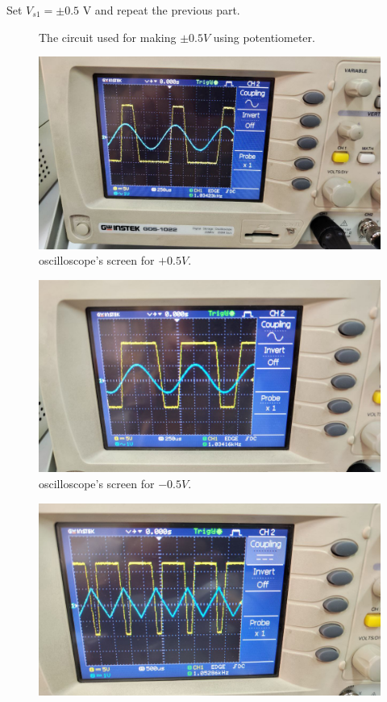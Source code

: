 \documentclass[11pt]{article}
\newcommand{\PicScale}{0.2}
\begin{document}
\begin{question}
\begin{subquestion}{Set $V_{s1}=\pm 0.5$ V and repeat the previous part.}
{\begin{figure}[H]
                \caption{The circuit used for making $\pm 0.5V$ using potentiometer.}
            \end{figure}
            \begin{figure}[H]
                \centering
                \includegraphics[scale=\PicScale,angle=0]{Fig/7.jpeg}
                \caption{oscilloscope's screen for $+0.5V$.}
            \end{figure}
            \begin{figure}[H]
                \centering
                \includegraphics[scale=\PicScale,angle=0]{Fig/9.jpeg}
                \caption{oscilloscope's screen for $-0.5V$.}
            \end{figure}
            \begin{figure}[H]
                \centering
                \includegraphics[scale=\PicScale,angle=0]{Fig/52.jpeg}

\end{figure}}
\end{subquestion}
\end{question}
\end{document}
